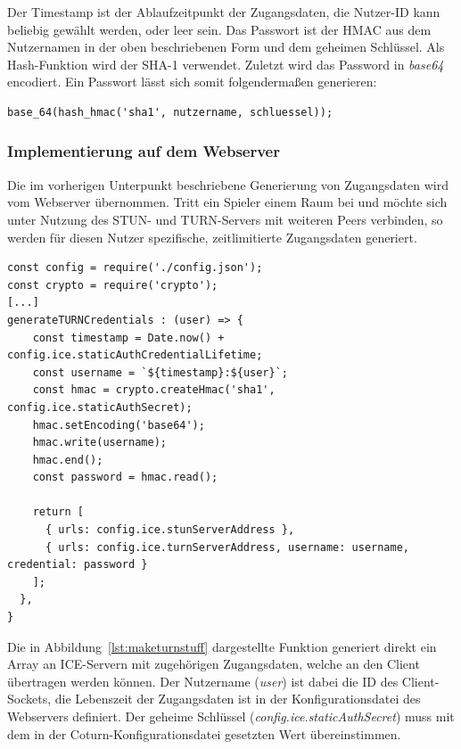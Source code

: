 Der Timestamp ist der Ablaufzeitpunkt der Zugangsdaten, die Nutzer-ID kann beliebig gewählt werden, oder leer sein. Das Passwort ist der \acf{HMAC} aus dem Nutzernamen in der oben beschriebenen Form und dem geheimen Schlüssel. Als Hash-Funktion wird der \acf{SHA-1} verwendet. Zuletzt wird das Password in \textit{base64} encodiert. Ein Passwort lässt sich somit folgendermaßen generieren:
\lstset{style=STYLE_COMMAND_LINE_ARGUMENT_SINGLE_LINE}
\begin{lstlisting}[belowskip=-0.8 \baselineskip]
base_64(hash_hmac('sha1', nutzername, schluessel));
\end{lstlisting}

\subsubsection{Implementierung auf dem Webserver}
Die im vorherigen Unterpunkt beschriebene Generierung von Zugangsdaten wird vom Webserver übernommen. Tritt ein Spieler einem Raum bei und möchte sich unter Nutzung des STUN- und TURN-Servers mit weiteren Peers verbinden, so werden für diesen Nutzer spezifische, zeitlimitierte Zugangsdaten generiert.

\vspace{6pt}
\lstset{language=js, style=STYLE_CODE_JS}
\begin{singlespace}
\begin{lstlisting}[caption={Funktion zum Erstellen von Zugangsdaten -- utils.js}, captionpos=b, label={lst:maketurnstuff}]
const config = require('./config.json');
const crypto = require('crypto');
[...]
generateTURNCredentials : (user) => {
    const timestamp = Date.now() + config.ice.staticAuthCredentialLifetime;
    const username = `${timestamp}:${user}`;
    const hmac = crypto.createHmac('sha1', config.ice.staticAuthSecret);
    hmac.setEncoding('base64');
    hmac.write(username);
    hmac.end();
    const password = hmac.read();

    return [
      { urls: config.ice.stunServerAddress },
      { urls: config.ice.turnServerAddress, username: username, credential: password }
    ];
  },
}
\end{lstlisting}
\end{singlespace}

Die in Abbildung~\ref{lst:maketurnstuff} dargestellte Funktion generiert direkt ein Array an ICE-Servern mit zugehörigen Zugangsdaten, welche an den Client übertragen werden können. Der Nutzername (\textit{user}) ist dabei die ID des Client-Sockets, die Lebenszeit der Zugangsdaten ist in der Konfigurationsdatei des Webservers definiert. Der geheime Schlüssel (\textit{config.ice.staticAuthSecret}) muss mit dem in der Coturn-Konfigurationsdatei gesetzten Wert übereinstimmen.

